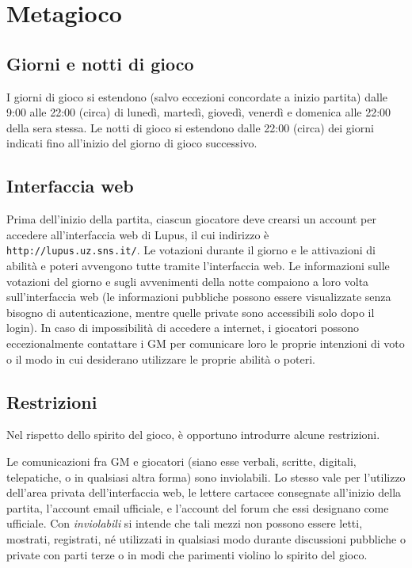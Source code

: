 \documentclass[a4paper,10pt]{article}
\begin{document}
\pagebreak

\section{Metagioco}

\subsection{Giorni e notti di gioco}

I giorni di gioco si estendono (salvo eccezioni concordate a inizio partita) dalle 9:00 alle 22:00 (circa) di lunedì, martedì, giovedì, venerdì e domenica alle 22:00 della sera stessa. Le notti di gioco si estendono dalle 22:00 (circa) dei giorni indicati fino all'inizio del giorno di gioco successivo.

\subsection{Interfaccia web}

Prima dell'inizio della partita, ciascun giocatore deve crearsi un account per accedere all'interfaccia web di Lupus, il cui indirizzo è \verb|http://lupus.uz.sns.it/|.
Le votazioni durante il giorno e le attivazioni di abilità e poteri avvengono tutte tramite l'interfaccia web. Le informazioni sulle votazioni del giorno e sugli avvenimenti della notte compaiono a loro volta sull'interfaccia web (le informazioni pubbliche possono essere visualizzate senza bisogno di autenticazione, mentre quelle private sono accessibili solo dopo il login). In caso di impossibilità di accedere a internet, i giocatori possono eccezionalmente contattare i GM per comunicare loro le proprie intenzioni di voto o il modo in cui desiderano utilizzare le proprie abilità o poteri.

\subsection{Restrizioni}

Nel rispetto dello spirito del gioco, è opportuno introdurre alcune restrizioni.

Le comunicazioni fra GM e giocatori (siano esse verbali, scritte, digitali, telepatiche, o in qualsiasi altra forma) sono inviolabili. Lo stesso vale per l'utilizzo dell'area privata dell'interfaccia web, le lettere cartacee consegnate all'inizio della partita, l'account email ufficiale, e l'account del forum che essi designano come ufficiale.
Con \emph{inviolabili} si intende che tali mezzi non possono essere letti, mostrati, registrati, né utilizzati in qualsiasi modo durante discussioni pubbliche o private con parti terze o in modi che parimenti violino lo spirito del gioco.
\end{document}
